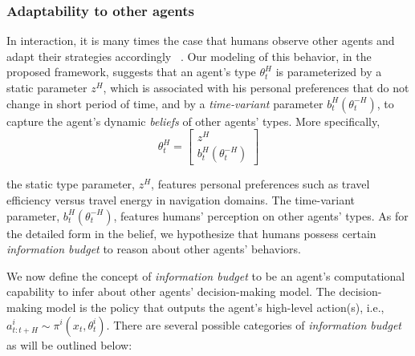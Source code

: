 \documentclass[letterpaper, 10 pt, conference]{ieeeconf}  %
\begin{document}
\vspace{-.2em}
\subsubsection{Adaptability to other agents}\label{sec:adaptability}
\vspace{-.2em}
In interaction, it is many times the case that humans observe other agents and adapt their strategies accordingly ~\cite{nikolaidis2016formalizing,yang2017evaluating}. Our modeling of this behavior, in the proposed framework, suggests that an agent's type $\theta^H_t$ is parameterized by a static parameter $z^H$, which is associated with his personal preferences that do not change in short period of time, and by a \textit{time-variant} parameter $b^H_t(\theta^{-H}_t)$, to capture the agent's dynamic \textit{beliefs} of other agents' types. More specifically,
\begin{equation}
  \theta^H_t = \begin{bmatrix}
    z^H \\
    b^H_t(\theta^{-H}_t)
  \end{bmatrix}
\end{equation}

the static type parameter, $z^H$, features personal preferences such as travel efficiency versus travel energy in navigation domains. The time-variant parameter, $b^H_t(\theta^{-H}_t)$, features humans' perception on other agents' types. As for the detailed form in the belief, we hypothesize that humans possess certain \textit{information budget} to reason about other agents' behaviors.

We now define the concept of \textit{information budget} to be an agent's computational capability to infer about other agents' decision-making model. The decision-making model is the policy that outputs the agent's high-level action(s), i.e., $a^i_{t:t+H} \sim \pi^i(x_t,\theta^i_t)$. There are several possible categories of \textit{information budget} as will be outlined below:
\end{document}
